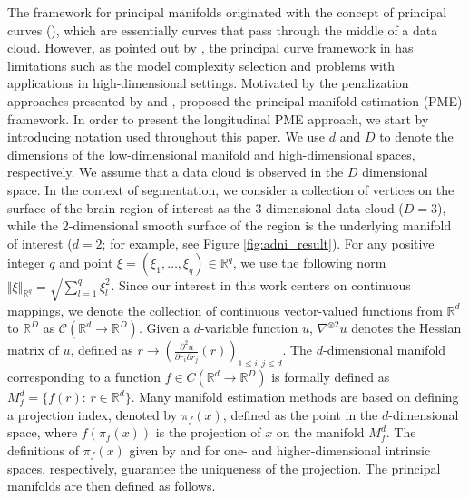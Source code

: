 \documentclass[12pt]{article}
\theoremstyle{definition}
\begin{document}
The framework for principal manifolds originated with the concept of principal curves (\cite{hastiePrincipalCurves1989}), which are essentially curves that pass through the middle of a data cloud. However, as pointed out by \cite{duchamp1996extremal}, the principal curve framework in \cite{hastiePrincipalCurves1989} has limitations such as the model complexity selection and problems with applications in high-dimensional settings. Motivated by the penalization approaches presented by \cite{kegl2000learning} and \cite{smolaRegularizedPrincipalManifolds2001}, \cite{mengPrincipalManifoldEstimation2021} proposed the principal manifold estimation (PME) framework. In order to present the longitudinal PME approach, we start by introducing notation used throughout this paper. We use $d$ and $D$ to denote the dimensions of the low-dimensional manifold and high-dimensional spaces, respectively. We assume that a data cloud is observed in the $D$ dimensional space. In the context of segmentation, we consider a collection of vertices on the surface of the brain region of interest as the 3-dimensional data cloud ($D=3$), while the 2-dimensional smooth surface of the region is the underlying manifold of interest ($d=2$; for example, see Figure \ref{fig:adni_result}). For any positive integer $q$ and point $\xi=(\xi_1,\ldots,\xi_q)\in\mathbb{R}^q$, we use the following norm $\Vert \xi\Vert_{\mathbb{R}^q}=\sqrt{\sum_{l=1}^q \xi_l^2}$. Since our interest in this work centers on continuous mappings, we denote the collection of continuous vector-valued functions from $\mathbb{R}^d$ to $\mathbb{R}^D$ as $\mathcal{C}(\mathbb{R}^{d} \to \mathbb{R}^{D})$. Given a $d$-variable function $u$, $\nabla^{\otimes 2} u$ denotes the Hessian matrix of $u$, defined as $r \to \left( \frac{\partial ^2 u}{\partial r_i \partial r_j}(r) \right)_{1 \leq i, j \leq d}$. The $d$-dimensional manifold corresponding to a function $f \in C(\mathbb{R}^{d} \to \mathbb{R}^{D})$ is formally defined as $M_f^d=\{f(r):\,r\in\mathbb{R}^d\}$. Many manifold estimation methods are based on defining a projection index, denoted by $\pi_f(x)$, defined as the point in the $d$-dimensional space, where $f(\pi_f(x))$ is the projection of $x$ on the manifold $M_f^d$. The definitions of $\pi_f(x)$ given by \cite{hastiePrincipalCurves1989} and \cite{mengPrincipalManifoldEstimation2021} for one- and higher-dimensional intrinsic spaces, respectively, guarantee the uniqueness of the projection. The principal manifolds are then defined as follows.
\end{document}
